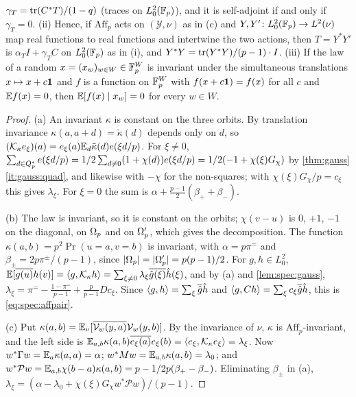 \begin{lemma}
\begin{enumerate}[label=\textup{(\alph*)}]
  $\gamma_T=\operatorname{tr}(C^*T)/(1-q)$ (traces on $L^2_0(\mathbb F_p)$), and it is self-adjoint if and
  only if $\gamma_T=0$. (ii) Hence, if $\mathrm{Aff}_p$ acts on $(\mathcal Y,\nu)$ as in
  (c) and $Y,Y'\colon L^2_0(\mathbb F_p)\to L^2(\nu)$ map real functions to real functions
  and intertwine the two actions, then $T=Y^*Y'$ is $\alpha_TI+\gamma_TC$ on
  $L^2_0(\mathbb F_p)$ as in (i), and $Y^*Y=\operatorname{tr}(Y^*Y)/(p-1)\cdot I$. (iii) If the law of a random
  $x=(x_w)_{w\in W}\in\mathbb F_p^W$ is invariant under the simultaneous translations
  $x\mapsto x+c\mathbf 1$ and $f$ is a function on $\mathbb F_p^W$ with $f(x+c\mathbf 1)=f(x)$ for all
  $c$ and $\mathbb E f(x)=0$, then $\mathbb E[f(x)\mid x_w]=0$ for every $w\in W$.
\end{enumerate}
\end{lemma}

\begin{proof}
(a) An invariant $\kappa$ is constant on the three orbits. By translation
invariance $\kappa(a,a+d)=\tilde\kappa(d)$ depends only on $d$, so
$(\mathcal K_\kappa e_\xi)(a)=e_\xi(a)\mathbb E_d\tilde\kappa(d)e\!\left(\xi d/p\right)$. For $\xi\ne0$,
$\sum_{d\in Q_{p}^{*}}e\!\left(\xi d/p\right)=1/2\sum_{d\ne0}(1+\chi(d))e\!\left(\xi d/p\right)=1/2(-1+\chi(\xi)G_\chi)$
by \cref{thm:gauss}\ref{it:gauss:quad}, and likewise with $-\chi$ for the
non-squares; with $\chi(\xi)G_\chi/p=c_\xi$ this gives $\lambda_\xi$. For $\xi=0$
the sum is $\alpha+\frac{p-1}2(\beta_++\beta_-)$.

(b) The law is invariant, so it is constant on the orbits; $\chi(v-u)$ is $0$,
$+1$, $-1$ on the diagonal, on $\Omega_{p}$ and on $\Omega_{p}'$, which gives the
decomposition. The function $\kappa(a,b)=p^2\Pr(u=a,v=b)$ is invariant, with
$\alpha=p\pi^=$ and $\beta_\pm=2p\pi^\pm/(p-1)$, since $|\Omega_{p}|=|\Omega_{p}'|=p(p-1)/2$.
For $g,h\in L^2_0$, $\mathbb E[\overline{g(u)}h(v)]=\left\langle g,\mathcal K_\kappa h\right\rangle=\sum_{\xi\ne0}\lambda_\xi
\overline{\hat g(\xi)}\hat h(\xi)$, and by (a) and \cref{lem:spec:gauss},
$\lambda_\xi=\pi^=-\frac{1-\pi^=}{p-1}+\frac p{p-1}Dc_\xi$. Since
$\left\langle g,h\right\rangle=\sum_\xi\overline{\hat g}\hat h$ and $\left\langle g,Ch\right\rangle=\sum_\xi c_\xi\overline{\hat g}\hat h$,
this is \eqref{eq:spec:affpair}.

(c) Put $\kappa(a,b)=\mathbb E_\nu[\overline{\mathcal V_w(y,a)}\mathcal V_w(y,b)]$. By the invariance
of $\nu$, $\kappa$ is $\mathrm{Aff}_p$-invariant, and the left side is
$\mathbb E_{a,b}\kappa(a,b)\overline{e_\xi(a)}e_\xi(b)=\left\langle e_\xi,\mathcal K_\kappa e_\xi\right\rangle=\lambda_\xi$. Now
$w^*\Gamma w=\mathbb E_a\kappa(a,a)=\alpha$; $w^*Mw=\mathbb E_{a,b}\kappa(a,b)=\lambda_0$; and
$w^*\mathcal Pw=\mathbb E_{a,b}\chi(b-a)\kappa(a,b)=p-1/2p(\beta_+-\beta_-)$. Eliminating
$\beta_\pm$ in (a), $\lambda_\xi=(\alpha-\lambda_0+\chi(\xi)G_\chi w^*\mathcal Pw)/(p-1)$.


\end{proof}
